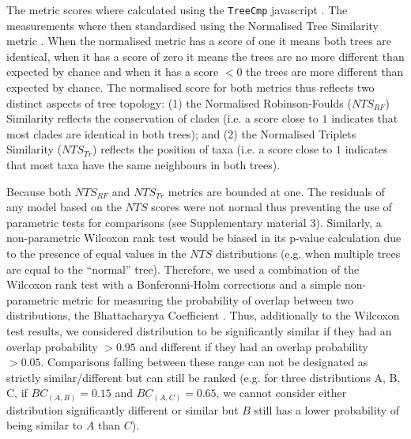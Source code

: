 \documentclass[12pt,letterpaper]{article}
\begin{document}
The metric scores where calculated using the \texttt{TreeCmp} javascript \citep{Bogdanowicz2012}.
The measurements where then standardised using the Normalised Tree Similarity metric \citep[$NTS$; i.e. centering the metrics scores using the mean metric score for 1000 pairwise comparisons between random trees with $n$ taxa;][]{Bogdanowicz2012,Guillerme2016146}.
When the normalised metric has a score of one it means both trees are identical, when it has a score of zero it means the trees are no more different than expected by chance and when it has a score $<0$ the trees are more different than expected by chance.
The normalised score for both metrics thus reflects two distinct aspects of tree topology: (1) the Normalised Robinson-Foulds ($NTS_{RF}$) Similarity reflects the conservation of clades (i.e. a score close to $1$ indicates that most clades are identical in both trees); and (2) the Normalised Triplets Similarity ($NTS_{Tr}$) reflects the position of taxa (i.e. a score close to $1$ indicates that most taxa have the same neighbours in both trees).

Because both $NTS_{RF}$ and $NTS_{Tr}$ metrics are bounded at one.
The residuals of any model based on the $NTS$ scores were not normal thus preventing the use of parametric tests for comparisons (see Supplementary material 3).
Similarly, a non-parametric Wilcoxon rank test \citep{hollander2013nonparametric} would be biased in its p-value calculation due to the presence of equal values in the $NTS$ distributions (e.g. when multiple trees are equal to the ``normal'' tree).
Therefore, we used a combination of the Wilcoxon rank test with a Bonferonni-Holm corrections \citep[to ensure our significant results were robust to Type I error rate inflation;][]{holm1979simple} and a simple non-parametric metric for measuring the probability of overlap between two distributions, the Bhattacharyya Coefficient \citep[$BC$;][]{Bhattacharyya,Guillerme2016146,soto2016trace}.
Thus, additionally to the Wilcoxon test results, we considered distribution to be significantly similar if they had an overlap probability $>0.95$ and different if they had an overlap probability $>0.05$.
Comparisons falling between these range can not be designated as strictly similar/different but can still be ranked (e.g. for three distributions A, B, C, if $BC_{(A,B)} = 0.15$ and $BC_{(A,C)} = 0.65$, we cannot consider either distribution significantly different or similar but $B$ still has a lower probability of being similar to $A$ than $C$).
\end{document}
